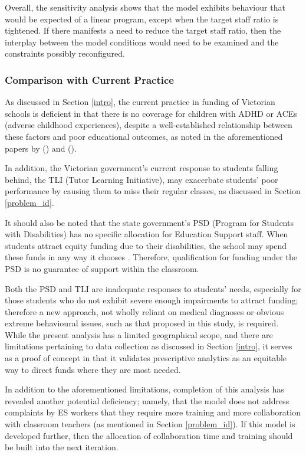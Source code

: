 \documentclass[11pt, a4paper]{article}
\begin{document}
    Overall, the sensitivity analysis shows that the model exhibits behaviour that would be expected of a linear program, except when the target staff ratio is tightened. If there manifests a need to reduce the target staff ratio, then the interplay between the model conditions would need to be examined and the constraints possibly reconfigured.

    \subsubsection{Comparison with Current Practice}

    As discussed in Section \ref{intro}, the current practice in funding of Victorian schools is deficient in that there is no coverage for children with ADHD or ACEs (adverse childhood experiences), despite a well-established relationship between these factors and poor educational outcomes, as noted in the aforementioned papers by  () and  (). 
    
    In addition, the Victorian government's current response to students falling behind, the TLI (Tutor Learning Initiative), may exacerbate students' poor performance by causing them to miss their regular classes, as discussed in Section \ref{problem_id}.

    It should also be noted that the state government's PSD (Program for Students with Disabilities) has no specific allocation for Education Support staff. When students attract equity funding due to their disabilities, the school may spend these funds in any way it chooses \parencite{srp_vic}. Therefore, qualification for funding under the PSD is no guarantee of support within the classroom. 

    Both the PSD and TLI are inadequate responses to students' needs, especially for those students who do not exhibit severe enough impairments to attract funding; therefore a new approach, not wholly reliant on medical diagnoses or obvious extreme behavioural issues, such as that proposed in this study, is required. While the present analysis has a limited geographical scope, and there are limitations pertaining to data collection as discussed in Section \ref{intro}, it serves as a proof of concept in that it validates prescriptive analytics as an equitable way to direct funds where they are most needed.

    In addition to the aforementioned limitations, completion of this analysis has revealed another potential deficiency; namely, that the model does not address complaints by ES workers that they require more training and more collaboration with classroom teachers (as mentioned in Section \ref{problem_id}). If this model is developed further, then the allocation of collaboration time and training should be built into the next iteration. 
\end{document}
